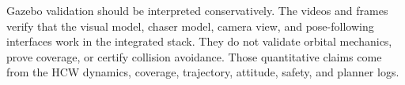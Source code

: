 Gazebo validation should be interpreted conservatively. The videos and frames
verify that the visual model, chaser model, camera view, and pose-following
interfaces work in the integrated stack. They do not validate orbital
mechanics, prove coverage, or certify collision avoidance. Those quantitative
claims come from the HCW dynamics, coverage, trajectory, attitude, safety, and
planner logs.
